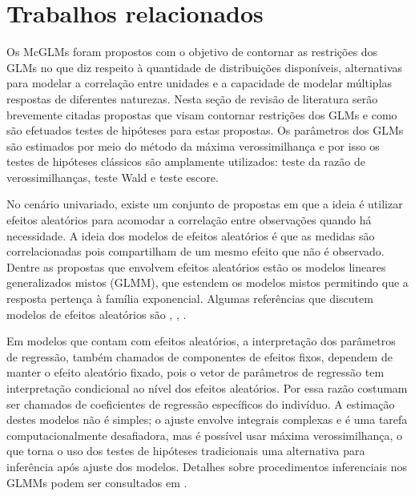 
\chapter{Trabalhos relacionados}\label{cap:trabalhos}


Os McGLMs foram propostos com o objetivo de contornar as restrições dos GLMs no que diz respeito à quantidade de distribuições disponíveis, alternativas para modelar a correlação entre unidades e a capacidade de modelar múltiplas respostas de diferentes naturezas. Nesta seção de revisão de literatura serão brevemente citadas propostas que visam contornar restrições dos GLMs e como são efetuados testes de hipóteses para estas propostas. Os parâmetros dos GLMs são estimados por meio do método da máxima verossimilhança e por isso os testes de hipóteses clássicos são amplamente utilizados: teste da razão de verossimilhanças, teste Wald e teste escore.


No cenário univariado, existe um conjunto de propostas em que a ideia é utilizar efeitos aleatórios para acomodar a correlação entre observações quando há necessidade. A ideia dos modelos de efeitos aleatórios é que as medidas são correlacionadas pois compartilham de um mesmo efeito que não é observado. Dentre as propostas que envolvem efeitos aleatórios estão os modelos lineares generalizados mistos (GLMM), que estendem os modelos mistos permitindo que a resposta pertença à família exponencial. Algumas referências que discutem modelos de efeitos aleatórios são \citet{laird1982random}, \citet{jiang2007linear}, \citet{stroup2012generalized}.

Em modelos que contam com efeitos aleatórios, a interpretação dos parâmetros de regressão, também chamados de componentes de efeitos fixos, dependem de manter o efeito aleatório fixado, pois o vetor de parâmetros de regressão tem interpretação condicional ao nível dos efeitos aleatórios. Por essa razão costumam ser chamados de coeficientes de regressão específicos do indivíduo. A estimação destes modelos não é simples; o ajuste envolve integrais complexas e é uma tarefa computacionalmente desafiadora, mas é possível usar máxima verossimilhança, o que torna o uso dos testes de hipóteses tradicionais uma alternativa para inferência após ajuste dos modelos. Detalhes sobre procedimentos inferenciais nos GLMMs podem ser consultados em \citet{tuerlinckx2006statistical}.

